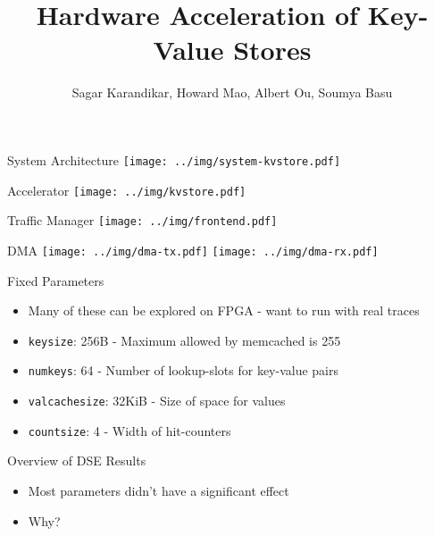 \documentclass{beamer}
\title{Hardware Acceleration of Key-Value Stores}
\author{Sagar Karandikar, Howard Mao, Albert Ou, Soumya Basu}
\institute[UC Berkeley]{\textsc{University of California, Berkeley}}
\begin{document}
\frame{\titlepage}

\begin{frame}
    
\end{frame}

\begin{frame}{System Architecture}
    \texttt{[image: ../img/system-kvstore.pdf]}
\end{frame}

\begin{frame}{Accelerator}
    \texttt{[image: ../img/kvstore.pdf]}
\end{frame}

\begin{frame}{Traffic Manager}
    \texttt{[image: ../img/frontend.pdf]}
\end{frame}

\begin{frame}{DMA}
    \texttt{[image: ../img/dma-tx.pdf]}
    \texttt{[image: ../img/dma-rx.pdf]}
\end{frame}

\begin{frame}
    
\end{frame}

\begin{frame}{Fixed Parameters}
    \begin{itemize}
        \item Many of these can be explored on FPGA - want to run with real traces
        \item \texttt{keysize}: 256B - Maximum allowed by memcached is 255
        \item \texttt{numkeys}: 64 - Number of lookup-slots for key-value pairs
        \item \texttt{valcachesize}: 32KiB - Size of space for values
        \item \texttt{countsize}: 4 - Width of hit-counters
    \end{itemize}
\end{frame}

\begin{frame}{Overview of DSE Results}
    \begin{itemize}
        \item Most parameters didn't have a significant effect
        \item Why?
    \end{itemize}
\end{frame}
\end{document}
